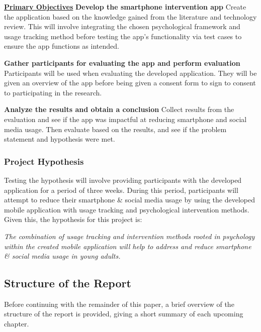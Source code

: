 \documentclass[12pt]{article}
\begin{document}
\noindent\underline{\textbf{Primary Objectives}}\newline\newline
\noindent\textbf{Develop the smartphone intervention app}\newline
Create the application based on the knowledge gained from the literature and technology review. This will involve
integrating the chosen psychological framework and usage tracking method before testing the app's functionality
via test cases to ensure the app functions as intended.  \newline

\noindent\textbf{Gather participants for evaluating the app and perform evaluation}\newline
Participants will be used when evaluating the developed application. They will be given an overview of the app 
before being given a consent form to sign to consent to participating in the research. \newline

\noindent\textbf{Analyze the results and obtain a conclusion}\newline
Collect results from the evaluation and see if the app was impactful at reducing smartphone and social media usage. 
Then evaluate based on the results, and see if the problem statement and hypothesis were met.\newline 


\subsubsection{Project Hypothesis}
Testing the hypothesis will involve providing participants with the developed application for a period of three weeks. %
During this period, participants will attempt to reduce their smartphone \& social media usage by using the developed mobile 
application with usage tracking and psychological intervention methods. Given this, the hypothesis for 
this project is: \newline

\noindent\textit{The combination of usage tracking and intervention methods rooted in psychology within the created mobile 
application will help to address and reduce smartphone \& social media usage in young adults.}
\newpage

\subsection{Structure of the Report}
Before continuing with the remainder of this paper, a brief overview of the structure of the report is provided, giving
a short summary of each upcoming chapter. \newline
\end{document}
